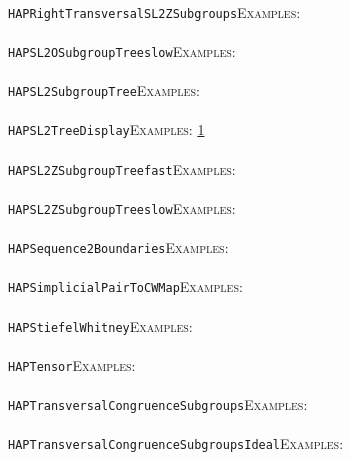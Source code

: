 \documentclass[a4paper,11pt]{report}
\begin{document}
{{ \\
 \texttt{HAP{\textunderscore}RightTransversalSL2ZSubgroups}{\nobreakspace}{\nobreakspace}{\nobreakspace}{\nobreakspace}\textsc{Examples:} \\
 \\
 \texttt{HAP{\textunderscore}SL2OSubgroupTree{\textunderscore}slow}{\nobreakspace}{\nobreakspace}{\nobreakspace}{\nobreakspace}\textsc{Examples:} \\
 \\
 \texttt{HAP{\textunderscore}SL2SubgroupTree}{\nobreakspace}{\nobreakspace}{\nobreakspace}{\nobreakspace}\textsc{Examples:} \\
 \\
 \texttt{HAP{\textunderscore}SL2TreeDisplay}{\nobreakspace}{\nobreakspace}{\nobreakspace}{\nobreakspace}\textsc{Examples:} \href{tutorial/chap10.html} {1}{\nobreakspace} \\
 \\
 \texttt{HAP{\textunderscore}SL2ZSubgroupTree{\textunderscore}fast}{\nobreakspace}{\nobreakspace}{\nobreakspace}{\nobreakspace}\textsc{Examples:} \\
 \\
 \texttt{HAP{\textunderscore}SL2ZSubgroupTree{\textunderscore}slow}{\nobreakspace}{\nobreakspace}{\nobreakspace}{\nobreakspace}\textsc{Examples:} \\
 \\
 \texttt{HAP{\textunderscore}Sequence2Boundaries}{\nobreakspace}{\nobreakspace}{\nobreakspace}{\nobreakspace}\textsc{Examples:} \\
 \\
 \texttt{HAP{\textunderscore}SimplicialPairToCWMap}{\nobreakspace}{\nobreakspace}{\nobreakspace}{\nobreakspace}\textsc{Examples:} \\
 \\
 \texttt{HAP{\textunderscore}StiefelWhitney}{\nobreakspace}{\nobreakspace}{\nobreakspace}{\nobreakspace}\textsc{Examples:} \\
 \\
 \texttt{HAP{\textunderscore}Tensor}{\nobreakspace}{\nobreakspace}{\nobreakspace}{\nobreakspace}\textsc{Examples:} \\
 \\
 \texttt{HAP{\textunderscore}TransversalCongruenceSubgroups}{\nobreakspace}{\nobreakspace}{\nobreakspace}{\nobreakspace}\textsc{Examples:} \\
 \\
 \texttt{HAP{\textunderscore}TransversalCongruenceSubgroupsIdeal}{\nobreakspace}{\nobreakspace}{\nobreakspace}{\nobreakspace}\textsc{Examples:} \\
}}
\end{document}
